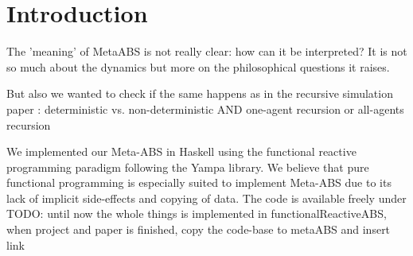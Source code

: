\section{Introduction}
The 'meaning' of MetaABS is not really clear: how can it be interpreted?
It is not so much about the dynamics but more on the philosophical questions it raises.

But also we wanted to check if the same happens as in the recursive simulation paper \cite{gilmer_recursive_2000}: deterministic vs. non-deterministic AND one-agent recursion or all-agents recursion

We implemented our Meta-ABS in Haskell using the functional reactive programming paradigm following the Yampa library. We believe that pure functional programming is especially suited to implement Meta-ABS due to its lack of implicit side-effects and copying of data. The code is available freely under
TODO: until now the whole things is implemented in functionalReactiveABS,  when project and paper is finished, copy the code-base to metaABS and insert link